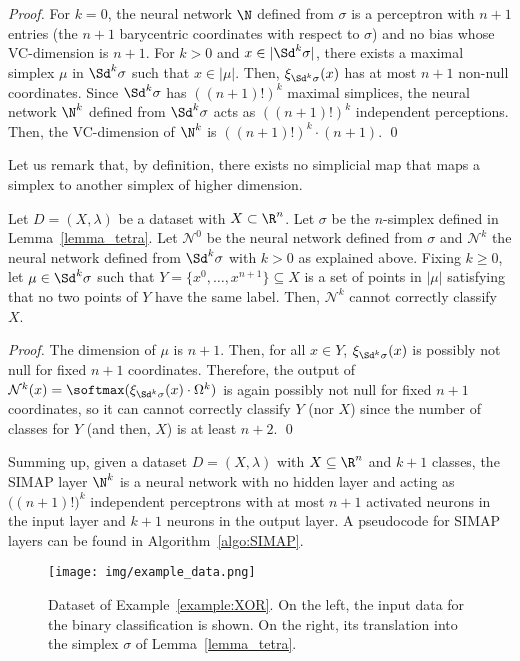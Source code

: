 \begin{proof}
For $k=0$, 
the neural network $\N$ defined from $\sigma$
is a perceptron with $n+1$ entries (the $n+1$ barycentric coordinates with respect to $\sigma$) and no bias  whose VC-dimension is $n+1$.
For $k>0$ 
and  $x\in |\Sd^k\sigma|$, there exists a maximal simplex $\mu$ in $\Sd^k\sigma$ such that  $x\in |\mu|$. Then, $\xi_{\Sd^k\sigma}(x)$ 
has at most
$n+1$ non-null coordinates. Since $\Sd^k\sigma$ has $((n+1)!)^k$ maximal simplices, the neural network $\N^k$ defined from $\Sd^k\sigma$
acts as $((n+1)!)^k$ independent perceptions. Then, the VC-dimension of $\N^k$ is
$((n+1)!)^k \cdot (n+1)$.
\qed  
\end{proof}

Let us remark that, by definition, there exists no simplicial map that 
maps a simplex to another simplex of higher dimension.
\begin{lemma}
Let $D=(X,\lambda)$ be a dataset with $X\subset\R^n$. Let $\sigma$ be
the $n$-simplex 
defined in Lemma~\ref{lemma_tetra}. Let $\mathcal{N}^0
$ be the neural network
defined from $\sigma$ and $\mathcal{N}^k$ the neural network
defined from $\Sd^k \sigma$ with $k>
0$ as explained above. 
Fixing $k\geq 0$, let $\mu\in \Sd^k \sigma$ 
such that $Y=\{x^0,\dots,x^{n+1}\}\subseteq X$ is a set of
points in $|\mu|$ satisfying that
no two 
points of $Y$ have
the same label. Then, $\mathcal{N}^k$ cannot correctly classify $X$.
\end{lemma}
\begin{proof}
The dimension of $\mu$ is $n+1$. 
Then, for all $x\in Y$, 
$\xi_{\Sd^k \sigma}(x)$ is possibly not null for fixed $n+1$ coordinates. Therefore, the
 output of $\mathcal{N}^k(x)=\softmax (\xi_{\Sd^k \sigma}(x)\cdot \Omega^k)$
is again possibly not null for fixed $n+1$ coordinates, so it can  cannot correctly classify $Y$ (nor $X$) since  the number of classes for $Y$ (and then, $X$) is at least $n+2$.  
\qed
\end{proof}


Summing up, given a dataset $D=(X,\lambda)$ with $X\subseteq \R^n$ and $k+1$ classes, the SIMAP layer $\N^k$ is a neural network with no hidden layer and 
acting as $\big((n+1)!\big)^k$ independent perceptrons with at most $n+1$ activated neurons in the input layer and $k+1$ neurons in the output layer. A pseudocode for SIMAP layers can be found in Algorithm~\ref{algo:SIMAP}.

\begin{figure*}[ht]
    \centering
    \texttt{[image: img/example\_data.png]}
    \caption{Dataset of Example~\ref{example:XOR}. On the left, the input data for the binary classification is shown. On the right, its translation into the simplex $\sigma$ of Lemma~\ref{lemma_tetra}.}
    \label{fig:example3}
\end{figure*}


